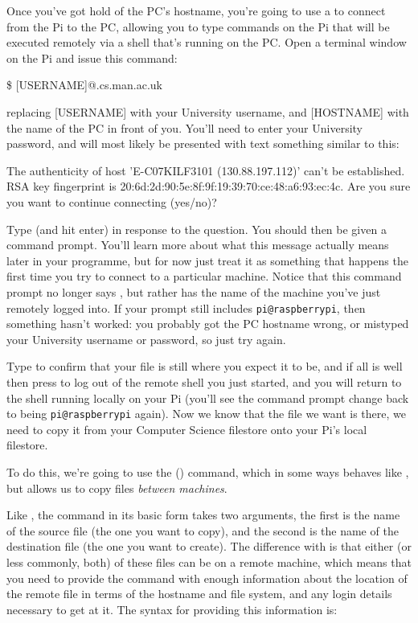 Once you've got hold of the PC's hostname, you're going to use a
 to connect from the Pi to the
PC, allowing you to type commands on the Pi that will be executed
remotely via a shell that's running on the PC. Open a terminal window
on the Pi and issue this command:

\begin{ttoutenv}
\$  [USERNAME]\!@\![HOSTNAME].cs.man.ac.uk
\end{ttoutenv}

replacing [USERNAME] with your University username, and [HOSTNAME]
with the name of the PC in front of you. You'll need to enter your
University password, and will most likely be presented with text
something similar to this:

\begin{ttoutenv}
The authenticity of host 'E-C07KILF3101 (130.88.197.112)' can't be
established.
RSA key fingerprint is 20:6d:2d:90:5e:8f:9f:19:39:70:ce:48:a6:93:ec:4c.
Are you sure you want to continue connecting (yes/no)?
\end{ttoutenv}

Type  (and hit enter) in response to the question. You
should then be given a command prompt. You'll learn more about what
this message actually means later in your programme, but for now just
treat it as something that happens the first time you try to connect
to a particular machine. Notice that this command prompt no longer
says , but rather has the name of the machine
you've just remotely logged into. If your prompt still includes
\texttt{pi@raspberrypi}, then something hasn't worked: you probably
got the PC hostname wrong, or mistyped your University username or
password, so just try again.

Type  to confirm that your  file is
still where you expect it to be, and if all is well then press
 to log out of the remote shell you just started, and you will
return to the shell running locally on your Pi (you'll see the command
prompt change back to being \texttt{pi@raspberrypi} again). Now we
know that the file we want is there, we need to copy it from your
Computer Science filestore onto your Pi's local filestore.

To do this, we're going to use the  () command, which in some ways behaves like , but
allows us to copy files \textit{between machines}.

Like , the  command in its basic form
takes two arguments, the first is the name of the source file (the one
you want to copy), and the second is the name of the destination file
(the one you want to create). The difference with  is
that either (or less commonly, both) of these files can be on a remote
machine, which means that you need to provide the command with enough
information about the location of the remote file in terms of the
hostname and file system, and any login details necessary to get at
it. The syntax for providing this information is:

